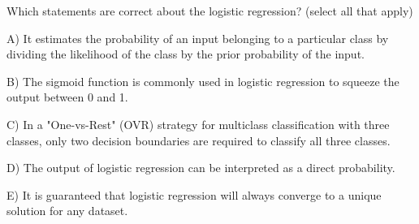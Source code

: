 Which statements are correct about the logistic regression? (select all that apply)


A) It estimates the probability of an input belonging to a particular class by dividing the likelihood of the class by the prior probability of the input.


B) The sigmoid function is commonly used in logistic regression to squeeze the output between 0 and 1.


C) In a "One-vs-Rest" (OVR) strategy for multiclass classification with three classes, only two decision boundaries are required to classify all three classes.


D) The output of logistic regression can be interpreted as a direct probability.


E) It is guaranteed that logistic regression will always converge to a unique solution for any dataset.
